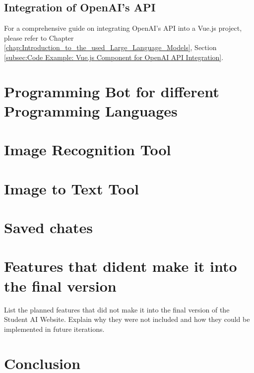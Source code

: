 \subsection{Integration of OpenAI's API}

For a comprehensive guide on integrating OpenAI's API into a Vue.js project, please refer to Chapter \ref{chap:Introduction_to_the_used_Large_Language_Models}, Section \ref{subsec:Code Example: Vue.js Component for OpenAI API Integration}.




\section{Programming Bot for different Programming Languages}

\section{Image Recognition Tool}

\section{Image to Text Tool}

\section{Saved chates}

\section{Features that dident make it into the final version}

List the planned features that did not make it into the final version of the Student AI Website.
Explain why they were not included and how they could be implemented in future iterations.

\section{Conclusion}





